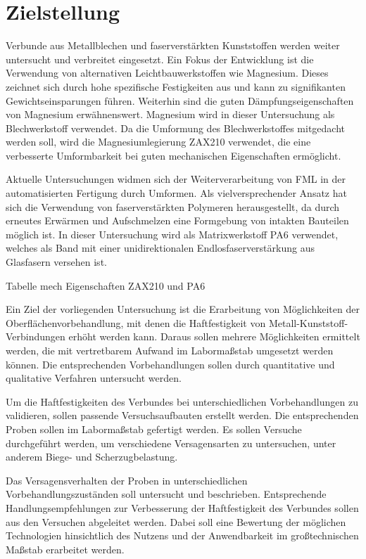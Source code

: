 \chapter{Zielstellung}\label{ch:ziel}


Verbunde aus Metallblechen und faserverstärkten Kunststoffen werden weiter untersucht und verbreitet eingesetzt.
Ein Fokus der Entwicklung ist die Verwendung von alternativen Leichtbauwerkstoffen wie Magnesium.
Dieses zeichnet sich durch hohe spezifische Festigkeiten aus und kann zu signifikanten Gewichtseinsparungen führen.
Weiterhin sind die guten Dämpfungseigenschaften von Magnesium erwähnenswert.
Magnesium wird in dieser Untersuchung als Blechwerkstoff verwendet.
Da die Umformung des Blechwerkstoffes mitgedacht werden soll, wird die Magnesiumlegierung ZAX210 verwendet, die eine verbesserte Umformbarkeit bei guten mechanischen Eigenschaften ermöglicht.

Aktuelle Untersuchungen widmen sich der Weiterverarbeitung von FML in der automatisierten Fertigung durch Umformen.
Als vielversprechender Ansatz hat sich die Verwendung von faserverstärkten Polymeren herausgestellt, da durch erneutes Erwärmen und Aufschmelzen eine Formgebung von intakten Bauteilen möglich ist.
In dieser Untersuchung wird als Matrixwerkstoff PA6 verwendet, welches als Band mit einer unidirektionalen Endlosfaserverstärkung aus Glasfasern versehen ist.

Tabelle mech Eigenschaften ZAX210 und PA6

Ein Ziel der vorliegenden Untersuchung ist die Erarbeitung von Möglichkeiten der Oberflächenvorbehandlung, mit denen die Haftfestigkeit von Metall-Kunststoff-Verbindungen erhöht werden kann.
Daraus sollen mehrere Möglichkeiten ermittelt werden, die mit vertretbarem Aufwand im Labormaßstab umgesetzt werden können.
Die entsprechenden Vorbehandlungen sollen durch quantitative und qualitative Verfahren untersucht werden.

Um die Haftfestigkeiten des Verbundes bei unterschiedlichen Vorbehandlungen zu validieren, sollen passende Versuchsaufbauten erstellt werden.
Die entsprechenden Proben sollen im Labormaßstab gefertigt werden.
Es sollen Versuche durchgeführt werden, um verschiedene Versagensarten zu untersuchen, unter anderem Biege- und Scherzugbelastung.

Das Versagensverhalten der Proben in unterschiedlichen Vorbehandlungszuständen soll untersucht und beschrieben.
Entsprechende Handlungsempfehlungen zur Verbesserung der Haftfestigkeit des Verbundes sollen aus den Versuchen abgeleitet werden.
Dabei soll eine Bewertung der möglichen Technologien hinsichtlich des Nutzens und der Anwendbarkeit im großtechnischen Maßstab erarbeitet werden.